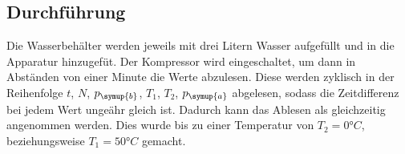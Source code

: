 \subsection{Durchführung}
Die Wasserbehälter werden jeweils mit drei Litern Wasser aufgefüllt und in die Apparatur hinzugefüt.
Der Kompressor wird eingeschaltet, um dann in Abständen von einer Minute die Werte abzulesen.
Diese werden zyklisch in der Reihenfolge $t$, $N$, $p_{\symup{b}}$, $T_1$, $T_2$, $p_{\symup{a}}$ abgelesen, sodass die Zeitdifferenz bei jedem Wert ungeähr gleich ist.
Dadurch kann das Ablesen als gleichzeitig angenommen werden. 
Dies wurde bis zu einer Temperatur von $T_2=0°C$, beziehungsweise $T_1=50°C$ gemacht.